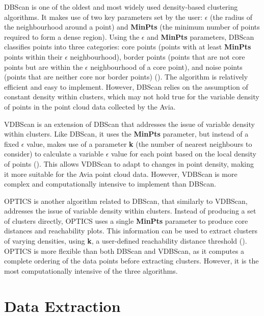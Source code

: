 \ac{DBScan} is one of the oldest and most widely used density-based clustering algorithms. It makes use of two key parameters set by the user: \textbf{$\epsilon$} (the radius of the neighbourhood around a point) and \textbf{MinPts} (the minimum number of points required to form a dense region). Using the \textbf{$\epsilon$} and \textbf{MinPts} parameters, \ac{DBScan} classifies points into three categories: core points (points with at least \textbf{MinPts} points within their \textbf{$\epsilon$} neighbourhood), border points (points that are not core points but are within the \textbf{$\epsilon$} neighbourhood of a core point), and noise points (points that are neither core nor border points) (\cite{esterDensityBasedAlgorithmDiscovering1996}). The algorithm is relatively efficient and easy to implement. However, \ac{DBScan} relies on the assumption of constant density within clusters, which may not hold true for the variable density of points in the point cloud data collected by the Avia.

\ac{VDBScan} is an extension of \ac{DBScan} that addresses the issue of variable density within clusters. Like \ac{DBScan}, it uses the \textbf{MinPts} parameter, but instead of a fixed \textbf{$\epsilon$} value, makes use of a parameter \textbf{k} (the number of nearest neighbours to consider) to calculate a variable \textbf{$\epsilon$} value for each point based on the local density of points (\cite{liuVDBSCANVariedDensity2007}). This allows \ac{VDBScan} to adapt to changes in point density, making it more suitable for the Avia point cloud data. However, \ac{VDBScan} is more complex and computationally intensive to implement than \ac{DBScan}.

\ac{OPTICS} is another algorithm related to \ac{DBScan}, that similarly to \ac{VDBScan}, addresses the issue of variable density within clusters. Instead of producing a set of clusters directly, \ac{OPTICS} uses a single \textbf{MinPts} parameter to produce core distances and reachability plots. This information can be used to extract clusters of varying densities, using \textbf{k}, a user-defined reachability distance threshold (\cite{ankerstOPTICSOrderingPoints1999}). \ac{OPTICS} is more flexible than both \ac{DBScan} and \ac{VDBScan}, as it computes a complete ordering of the data points before extracting clusters. However, it is the most computationally intensive of the three algorithms.

\section{Data Extraction}
\label{sec:ch6.section2}

